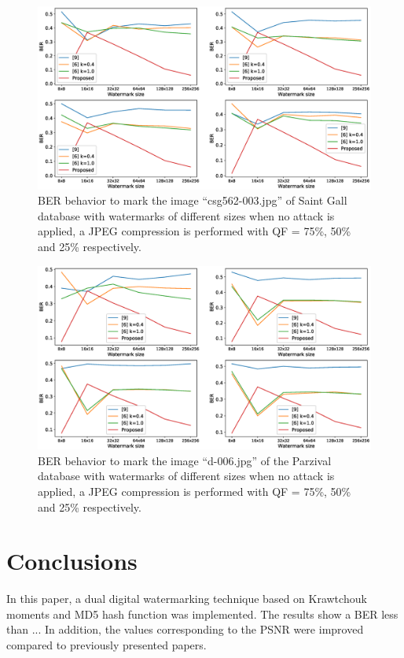 \documentclass[runningheads]{llncs}
\begin{document}
\begin{figure}
	\begin{center}
		\includegraphics[width=1.1\textwidth]{BERwsizeSaintGall.eps}
		\caption{BER behavior to mark the image ``csg562-003.jpg'' of Saint Gall database with watermarks of different sizes when no attack is applied, a JPEG compression is performed with QF = 75\%, 50\% and 25\% respectively.} \label{berwsizeSaintGall}
	\end{center}
\end{figure}
\begin{figure}
	\begin{center}
		\includegraphics[width=1.1\textwidth]{BERwsizeParzival.eps}
		\caption{BER behavior to mark the image ``d-006.jpg'' of the Parzival database with watermarks of different sizes when no attack is applied, a JPEG compression is performed with QF = 75\%, 50\% and 25\% respectively.} \label{berwsizeParzival}
	\end{center}
\end{figure}

\section{Conclusions}
In this paper, a dual digital watermarking technique based on Krawtchouk moments and MD5 hash function was implemented. The results show a BER less than ... In addition, the values corresponding to the PSNR were improved compared to previously presented papers.
%
%
%


%
\end{document}
